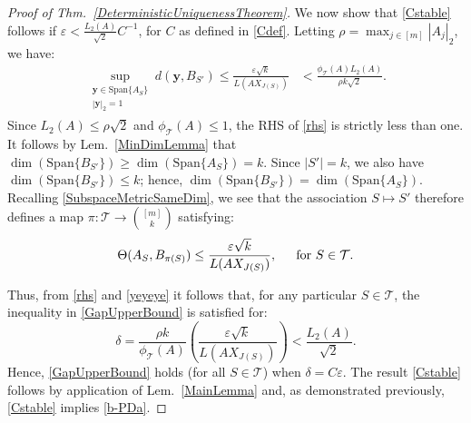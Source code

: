 \documentclass[journal, twocolumn]{IEEEtran}
\begin{document}
\begin{proof}[Proof of Thm.~\ref{DeterministicUniquenessTheorem}]
We now show that \eqref{Cstable} follows if $\varepsilon < \frac{L_2(A)}{\sqrt{2}}C^{-1}$, for $C$ as defined in \eqref{Cdef}. Letting $\rho = \max_{j \in [m]} |A_j|_2$, we have:
\begin{align}\label{rhs}
\sup_{ \substack{ \mathbf{y} \in \text{Span}\{A_{S}\} \\ |\mathbf{y}|_2 = 1} } d(\mathbf{y}, B_{S'}) \leq \frac{\varepsilon\sqrt{k}}{L(AX_{J(S)})}
&< \frac{\phi_\mathcal{T}(A) L_2(A)}{\rho k \sqrt{2}}.
\end{align}
Since $L_2(A) \leq \rho \sqrt{2}$ and $\phi_\mathcal{T}(A) \leq 1$, the RHS of \eqref{rhs} is strictly less than one. It follows by Lem.~\ref{MinDimLemma} that $\dim(\text{Span}\{B_{S'}\}) \geq \dim(\text{Span}\{A_{S}\}) = k$. %
Since $|S'| = k$, we also have $\dim(\text{Span}\{B_{S'}\}) \leq k$; hence, $\dim(\text{Span}\{B_{S'}\}) = \dim(\text{Span}\{A_{S}\})$. Recalling \eqref{SubspaceMetricSameDim},  we see that the association $S \mapsto S'$ therefore defines a map $\pi: \mathcal{T} \to {[m] \choose k}$ satisfying:
\begin{align}\label{yeyeye}
\Theta(A_{S}, B_{\pi(S)}) \leq \frac{\varepsilon\sqrt{k}}{ L(AX_{J(S)})}, \indent \text{for } S \in \mathcal{T}.
\end{align}

Thus, from \eqref{rhs} and \eqref{yeyeye} it follows that, for any particular $S \in \mathcal{T}$, the inequality in \eqref{GapUpperBound} is satisfied for:
\[ \delta = \frac{ \rho k}{ \phi_\mathcal{T}(A) } \left(  \frac{\varepsilon \sqrt{k}}{L(AX_{J(S)})} \right) < \frac{L_2(A)}{\sqrt{2}}. \] %
Hence, \eqref{GapUpperBound} holds (for all $S \in \mathcal{T}$) when $\delta = C\varepsilon$. %
The result \eqref{Cstable} follows by application of Lem.~\ref{MainLemma} and, as demonstrated previously, \eqref{Cstable} implies \eqref{b-PDa}.
\end{proof}
\end{document}
